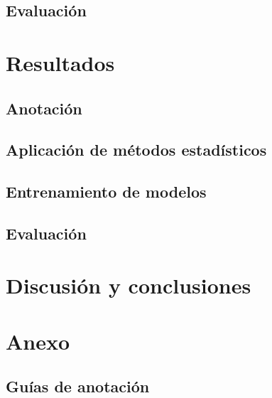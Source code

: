 \documentclass[colorinlistoftodos]{article}
\begin{document}
\subsection{Evaluaci\'on}


\section{Resultados}
\subsection{Anotación}\label{subsec-results-annotation}

\subsection{Aplicación de m\'etodos estad\'isticos}

\subsection{Entrenamiento de modelos}

\subsection{Evaluaci\'on}


\section{Discusi\'on y conclusiones}




\clearpage
\appendix
\section{Anexo}
\subsection{Guías de anotación}\label{appendix-annotation}


\listoftodos%
\end{document}
